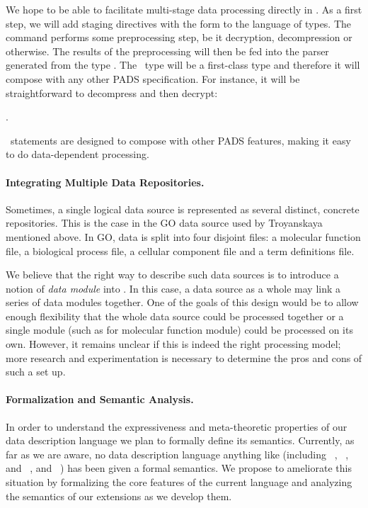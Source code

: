 \documentclass[11pt]{article}
\begin{document}
We hope to be able to facilitate multi-stage data processing 
directly in \datatype.  As a
first step, we will add staging directives with the form 
 to the language of types.
The command  performs some preprocessing step, be it
decryption, decompression or otherwise.  The results of the preprocessing
will then be fed into the parser generated from the type .
The \Pthen\ type will be a first-class type and therefore it will compose
with any other PADS specification.  For instance, it will be straightforward to
decompress and then decrypt:  

.  

\Pthen\ statements are designed to compose with other PADS features, making
it easy to do data-dependent processing.

\paragraph*{Integrating Multiple Data Repositories.}
Sometimes, a single logical data source is represented
as several distinct, concrete repositories.   This is the case
in the GO data source used by Troyanskaya mentioned above. 
In GO,  data is split into four disjoint
files: a molecular function file, a biological process file,
a cellular component file and a term definitions file.


We believe that the right way to describe such data sources
is to introduce a notion of {\em data module} into \pads{}.
In this case, a data source as a whole may link
a series of data modules together.  One of the goals
of this design would be to allow enough flexibility that
the whole data source could be processed together or a single module
(such as for molecular function module) could be processed on its own.
However, it remains unclear if this is indeed the right processing model;
more research and experimentation is necessary to determine the
pros and cons of such a set up.


\paragraph*{Formalization and Semantic Analysis.}
In order to understand the expressiveness and meta-theoretic
properties of our data description language
we plan to formally define its semantics.
Currently, as far as we are aware, no data description language
anything like \datatype{}
(including \pads~\cite{pads}, \packettypes~\cite{packettypes}, and \datascript~\cite{datascript}, and \blt~\cite{blt})
has been given a formal semantics.  
We propose to ameliorate this situation by
formalizing the core features of the current language
and analyzing the semantics of our extensions as we develop them.
\end{document}
